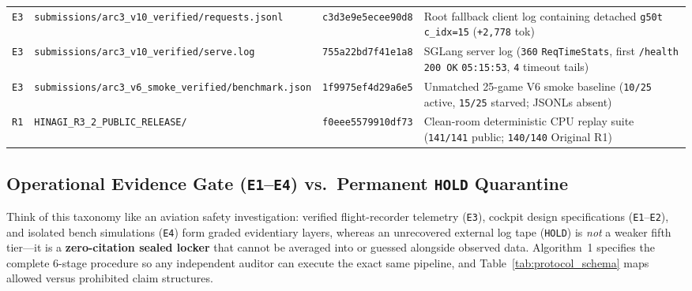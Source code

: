 \documentclass[10pt]{article}
\newcommand{\code}[1]{\texttt{#1}}
\begin{document}
\begin{table}[t]
{\begin{tabular}{@{}lll>{\raggedright\arraybackslash}p{6.5cm}@{}}
\code{E3} & \code{submissions/arc3\_v10\_verified/requests.jsonl} & \code{c3d3e9e5ecee90d8} & Root fallback client log containing detached \code{g50t c\_idx=15} (\code{+2,778} tok) \\
\code{E3} & \code{submissions/arc3\_v10\_verified/serve.log} & \code{755a22bd7f41e1a8} & SGLang server log (\code{360} \code{ReqTimeStats}, first \code{/health 200 OK} \code{05:15:53}, \code{4} timeout tails) \\
\code{E3} & \code{submissions/arc3\_v6\_smoke\_verified/benchmark.json} & \code{1f9975ef4d29a6e5} & Unmatched 25-game V6 smoke baseline (\code{10/25} active, \code{15/25} starved; JSONLs absent) \\
\code{R1} & \code{HINAGI\_R3\_2\_PUBLIC\_RELEASE/} & \code{f0eee5579910df73} & Clean-room deterministic CPU replay suite (\code{141/141} public; \code{140/140} Original R1) \\
\bottomrule
\end{tabular}%
}
\end{table}

\subsection{Operational Evidence Gate (\code{E1}--\code{E4}) vs.\ Permanent \code{HOLD} Quarantine}
Think of this taxonomy like an aviation safety investigation: verified flight-recorder telemetry (\code{E3}), cockpit design specifications (\code{E1}--\code{E2}), and isolated bench simulations (\code{E4}) form graded evidentiary layers, whereas an unrecovered external log tape (\code{HOLD}) is \emph{not} a weaker fifth tier---it is a \textbf{zero-citation sealed locker} that cannot be averaged into or guessed alongside observed data. Algorithm~1 specifies the complete 6-stage procedure so any independent auditor can execute the exact same pipeline, and Table~\ref{tab:protocol_schema} maps allowed versus prohibited claim structures.
\end{document}
